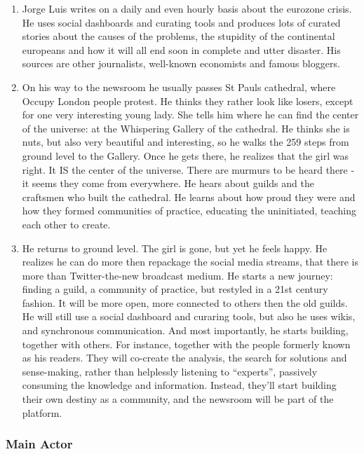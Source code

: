 \begin{enumerate}
\item
  Jorge Luis writes on a daily and even hourly basis about the eurozone
  crisis. He uses social dashboards and curating tools and produces lots
  of curated stories about the causes of the problems, the stupidity of
  the continental europeans and how it will all end soon in complete and
  utter disaster. His sources are other journalists, well-known
  economists and famous bloggers.
\item
  On his way to the newsroom he usually passes St Pauls cathedral, where
  Occupy London people protest. He thinks they rather look like losers,
  except for one very interesting young lady. She tells him where he can
  find the center of the universe: at the Whispering Gallery of the
  cathedral. He thinks she is nuts, but also very beautiful and
  interesting, so he walks the 259 steps from ground level to the
  Gallery. Once he gets there, he realizes that the girl was right. It
  IS the center of the universe. There are murmurs to be heard there -
  it seems they come from everywhere. He hears about guilds and the
  craftsmen who built the cathedral. He learns about how proud they were
  and how they formed communities of practice, educating the
  uninitiated, teaching each other to create.
\item
  He returns to ground level. The girl is gone, but yet he feels happy.
  He realizes he can do more then repackage the social media streams,
  that there is more than Twitter-the-new broadcast medium. He starts a
  new journey: finding a guild, a community of practice, but restyled in
  a 21st century fashion. It will be more open, more connected to others
  then the old guilds. He will still use a social dashboard and curaring
  tools, but also he uses wikis, and synchronous communication. And most
  importantly, he starts building, together with others. For instance,
  together with the people formerly known as his readers. They will
  co-create the analysis, the search for solutions and sense-making,
  rather than helplessly listening to ``experts'', passively consuming
  the knowledge and information. Instead, they'll start building their
  own destiny as a community, and the newsroom will be part of the
  platform.
\end{enumerate}
\subsubsection{Main Actor}


